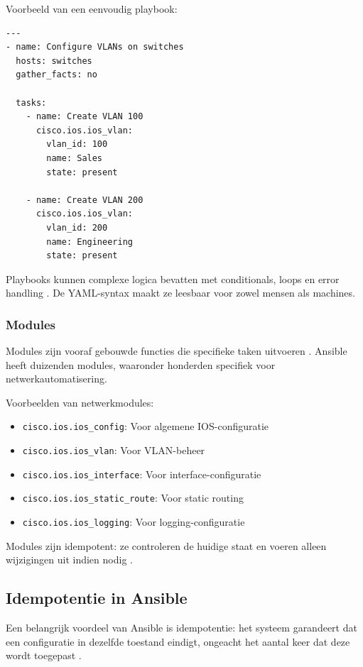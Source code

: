 Voorbeeld van een eenvoudig playbook:

\begin{verbatim}
---
- name: Configure VLANs on switches
  hosts: switches
  gather_facts: no
  
  tasks:
    - name: Create VLAN 100
      cisco.ios.ios_vlan:
        vlan_id: 100
        name: Sales
        state: present
    
    - name: Create VLAN 200
      cisco.ios.ios_vlan:
        vlan_id: 200
        name: Engineering
        state: present
\end{verbatim}

Playbooks kunnen complexe logica bevatten met conditionals, loops en error handling \autocite{Hochstein2017AnsibleUpRunning}.
De YAML-syntax maakt ze leesbaar voor zowel mensen als machines.

\subsubsection{Modules}
\label{subsubsec:modules}

Modules zijn vooraf gebouwde functies die specifieke taken uitvoeren \autocite{AnsibleCommunity2024ModuleIndex}. 
Ansible heeft duizenden modules, waaronder honderden specifiek voor netwerkautomatisering.

Voorbeelden van netwerkmodules:
\begin{itemize}
  \item \texttt{cisco.ios.ios\_config}: Voor algemene IOS-configuratie
  \item \texttt{cisco.ios.ios\_vlan}: Voor VLAN-beheer
  \item \texttt{cisco.ios.ios\_interface}: Voor interface-configuratie
  \item \texttt{cisco.ios.ios\_static\_route}: Voor static routing
  \item \texttt{cisco.ios.ios\_logging}: Voor logging-configuratie
\end{itemize}

Modules zijn idempotent: ze controleren de huidige staat en voeren alleen wijzigingen uit indien nodig \autocite{Hochstein2017AnsibleUpRunning}.

\subsection{Idempotentie in Ansible}
\label{subsec:ansible-idempotentie}

Een belangrijk voordeel van Ansible is idempotentie: het systeem garandeert dat een configuratie in dezelfde toestand eindigt, ongeacht het aantal keer dat deze wordt toegepast \autocite{Geerling2020AnsibleDevOps}.

